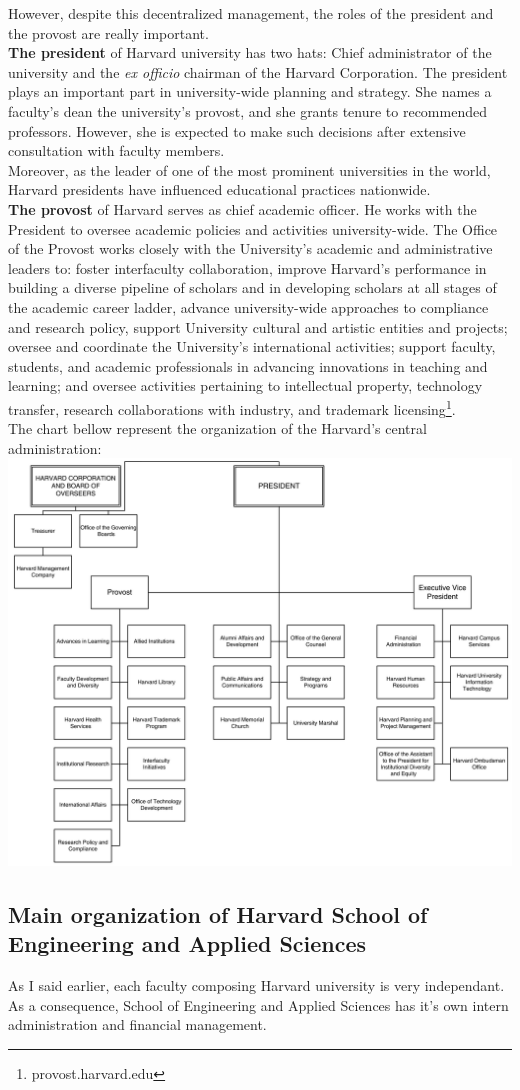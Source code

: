 \documentclass[10pt,a4paper]{article}
\newcommand{\seas}{School of Engineering and Applied Sciences}
\newcommand{\hseas}{Harvard School of Engineering and Applied Sciences}
\begin{document}
However, despite this decentralized management, the roles of the president and the provost are really important.\\

\textbf{The president} of Harvard university has two hats: Chief administrator of the university and the \textit{ex officio} chairman of the Harvard Corporation.
The president plays an important part in university-wide planning and strategy. She names a faculty's dean the university's provost, and she grants tenure to recommended professors. However, she is expected to make such decisions after extensive consultation with faculty members.\\
Moreover, as the leader of one of the most prominent universities in the world, Harvard presidents have influenced educational practices nationwide.\\

\textbf{The provost} of Harvard serves as chief academic officer. He works with the President to oversee academic policies and activities university-wide. The Office of the Provost works closely with the University’s academic and administrative leaders to: foster interfaculty collaboration, improve Harvard’s performance in building a diverse pipeline of scholars and in developing scholars at all stages of the academic career ladder, advance university-wide approaches to compliance and research policy, support University cultural and artistic entities and projects; oversee and coordinate the University’s international activities; support faculty, students, and academic professionals in advancing innovations in teaching and learning; and oversee activities pertaining to intellectual property, technology transfer, research collaborations with industry, and trademark licensing\footnote{provost.harvard.edu}.\\
The chart bellow represent the organization of the Harvard's central administration:\\
\includegraphics[width=1\textwidth]{images/chart2.png}

\subsection{Main organization of \hseas{}}
As I said earlier, each faculty composing Harvard university is very independant. As a consequence, \seas{} has it's own intern administration and financial management.
\end{document}
